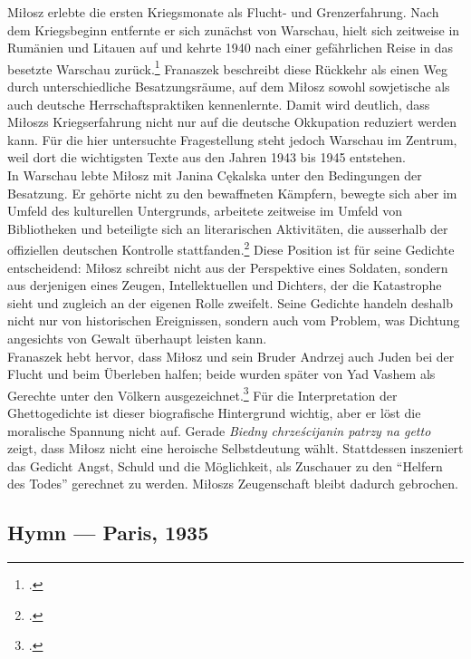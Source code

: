Miłosz erlebte die ersten Kriegsmonate als Flucht- und Grenzerfahrung. Nach dem Kriegsbeginn entfernte er sich zunächst von Warschau, hielt sich zeitweise in Rumänien und Litauen auf und kehrte 1940 nach einer gefährlichen Reise in das besetzte Warschau zurück.\footcite[vgl.][184--190]{franaszek-2017} Franaszek beschreibt diese Rückkehr als einen Weg durch unterschiedliche Besatzungsräume, auf dem Miłosz sowohl sowjetische als auch deutsche Herrschaftspraktiken kennenlernte. Damit wird deutlich, dass Miłoszs Kriegserfahrung nicht nur auf die deutsche Okkupation reduziert werden kann. Für die hier untersuchte Fragestellung steht jedoch Warschau im Zentrum, weil dort die wichtigsten Texte aus den Jahren 1943 bis 1945 entstehen.
\\[6pt]
In Warschau lebte Miłosz mit Janina Cękalska unter den Bedingungen der Besatzung. Er gehörte nicht zu den bewaffneten Kämpfern, bewegte sich aber im Umfeld des kulturellen Untergrunds, arbeitete zeitweise im Umfeld von Bibliotheken und beteiligte sich an literarischen Aktivitäten, die ausserhalb der offiziellen deutschen Kontrolle stattfanden.\footcite[vgl.][190--204]{franaszek-2017} Diese Position ist für seine Gedichte entscheidend: Miłosz schreibt nicht aus der Perspektive eines Soldaten, sondern aus derjenigen eines Zeugen, Intellektuellen und Dichters, der die Katastrophe sieht und zugleich an der eigenen Rolle zweifelt. Seine Gedichte handeln deshalb nicht nur von historischen Ereignissen, sondern auch vom Problem, was Dichtung angesichts von Gewalt überhaupt leisten kann.
\\[6pt]
Franaszek hebt hervor, dass Miłosz und sein Bruder Andrzej auch Juden bei der Flucht und beim Überleben halfen; beide wurden später von Yad Vashem als Gerechte unter den Völkern ausgezeichnet.\footcite[vgl.][186]{franaszek-2017} Für die Interpretation der Ghettogedichte ist dieser biografische Hintergrund wichtig, aber er löst die moralische Spannung nicht auf. Gerade {\itshape Biedny chrześcijanin patrzy na getto} zeigt, dass Miłosz nicht eine heroische Selbstdeutung wählt. Stattdessen inszeniert das Gedicht Angst, Schuld und die Möglichkeit, als Zuschauer zu den ``Helfern des Todes'' gerechnet zu werden. Miłoszs Zeugenschaft bleibt dadurch gebrochen.

\subsection{Hymn — Paris, 1935}

